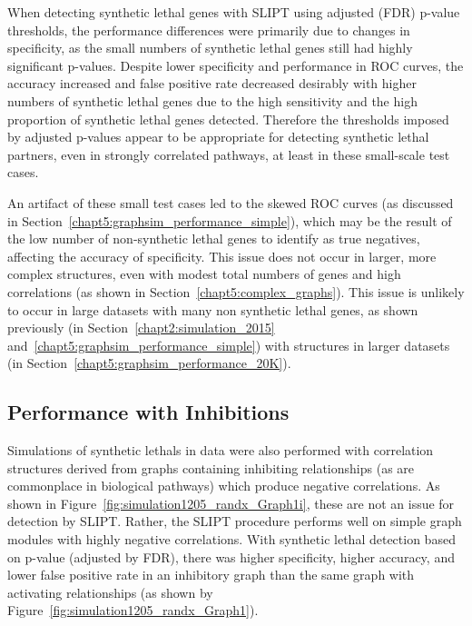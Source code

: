 When detecting \gls{synthetic lethal} genes with \gls{SLIPT} using adjusted (\gls{FDR}) p-value thresholds, the performance differences were primarily due to changes in specificity, as the small numbers of \gls{synthetic lethal} genes still had highly significant p-values. Despite lower specificity and performance in \gls{ROC} curves, the accuracy increased and false positive rate decreased desirably with higher numbers of \gls{synthetic lethal} genes due to the high sensitivity and the high proportion of \gls{synthetic lethal} genes detected. Therefore the thresholds imposed by adjusted p-values appear to be appropriate for detecting \gls{synthetic lethal} partners, even in strongly correlated pathways, at least in these small-scale test cases.

An artifact of these small test cases led to the skewed \gls{ROC} curves (as discussed in Section~\ref{chapt5:graphsim_performance_simple}), which may be the result of the low number of non-synthetic lethal genes to identify as true negatives, affecting the accuracy of specificity. This issue does not occur in larger, more complex  structures, even with modest total numbers of genes and high correlations (as shown in Section~\ref{chapt5:complex_graphs}). This issue is unlikely to occur in large  datasets with many non synthetic lethal genes, as shown previously (in Section~\ref{chapt2:simulation_2015} and~\ref{chapt5:graphsim_performance_simple}) with  structures in larger datasets (in Section~\ref{chapt5:graphsim_performance_20K}). 

\FloatBarrier


\subsection{Performance with Inhibitions}
\label{chapt5:graphsim_performance_inhib}

\FloatBarrier

Simulations of \glspl{synthetic lethal} in  data were also performed with correlation structures derived from \glspl{graph} containing inhibiting relationships (as are commonplace in biological pathways) which produce negative correlations. As shown in Figure~\ref{fig:simulation1205_randx_Graph1i}, these are not an issue for detection by \gls{SLIPT}. Rather, the \gls{SLIPT} procedure performs well on simple graph modules with highly negative correlations. With \gls{synthetic lethal} detection based on p-value (adjusted by \gls{FDR}), there was higher specificity, higher accuracy, and lower false positive rate in an inhibitory graph than the same graph with activating relationships (as shown by Figure~\ref{fig:simulation1205_randx_Graph1}).

